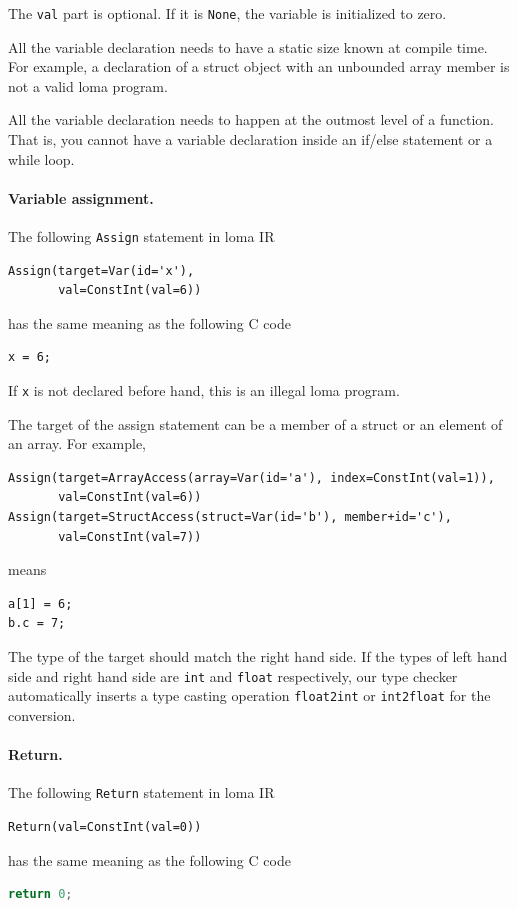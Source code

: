 The \lstinline{val} part is optional. If it is \lstinline{None}, the variable is initialized to zero.

All the variable declaration needs to have a static size known at compile time. For example, a declaration of a struct object with an unbounded array member is not a valid loma program.

All the variable declaration needs to happen at the outmost level of a function. That is, you cannot have a variable declaration inside an if/else statement or a while loop. 

\paragraph{Variable assignment.}
The following \lstinline{Assign} statement in loma IR
\begin{lstlisting}
Assign(target=Var(id='x'),
       val=ConstInt(val=6))
\end{lstlisting}
has the same meaning as the following C code
\begin{lstlisting}
x = 6;
\end{lstlisting}
If \lstinline{x} is not declared before hand, this is an illegal loma program.

The target of the assign statement can be a member of a struct or an element of an array. For example,
\begin{lstlisting}
Assign(target=ArrayAccess(array=Var(id='a'), index=ConstInt(val=1)),
       val=ConstInt(val=6))
Assign(target=StructAccess(struct=Var(id='b'), member+id='c'),
       val=ConstInt(val=7))
\end{lstlisting}
means
\begin{lstlisting}
a[1] = 6;
b.c = 7;
\end{lstlisting}

The type of the target should match the right hand side. If the types of left hand side and right hand side are \lstinline{int} and \lstinline{float} respectively, our type checker automatically inserts a type casting operation \lstinline{float2int} or \lstinline{int2float} for the conversion.

\paragraph{Return.}
The following \lstinline{Return} statement in loma IR
\begin{lstlisting}
Return(val=ConstInt(val=0))
\end{lstlisting}
has the same meaning as the following C code
\begin{lstlisting}[language=c]
return 0;
\end{lstlisting}

